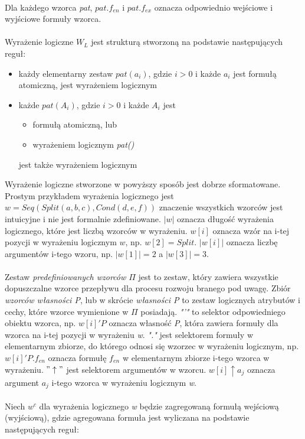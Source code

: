 \documentclass[a4paper, 11pt]{article}
\begin{document}
	\\
	Dla każdego wzorca \textit{pat}, $pat.f_{en}$ i $pat.f_{ex}$ oznacza odpowiednio wejściowe i wyjściowe formuły wzorca.
	\\
	\\
	Wyrażenie logiczne $W_L$ jest strukturą stworzoną na podstawie następujących reguł:
	\begin{itemize}
		\item każdy elementarny zestaw $pat(a_i)$, gdzie $i>0$ i każde $a_i$ jest formułą atomiczną, jest wyrażeniem logicznym
		\item każde $pat(A_i)$, gdzie $i>0$ i każde $A_i$ jest
		\begin{itemize}
			\item formułą atomiczną, lub
			\item wyrażeniem logicznym \textit{pat()}
		\end{itemize}
		jest także wyrażeniem logicznym
	\end{itemize}
	Wyrażenie logiczne stworzone w powyższy sposób jest dobrze sformatowane. Prostym przykładem wyrażenia logicznego jest $w=Seq(Split(a,b,c),Cond(d,e,f))$ znaczenie wszystkich wzorców jest intuicyjne i nie jest formalnie zdefiniowane. $|w|$ oznacza długość wyrażenia logicznego, które jest liczbą wzorców w wyrażeniu. $w[i]$ oznacza wzór na i-tej pozycji w wyrażeniu logicznym $w$, np. $w[2]=Split$. $|w[i]|$ oznacza liczbę argumentów i-tego wzoru, np. $|w[1]|=2$ a $|w[3]|=3.$
	\\
	\\
	Zestaw \textit{predefiniowanych wzorców $\Pi$} jest to zestaw, który zawiera wszystkie dopuszczalne wzorce przepływu dla procesu rozwoju branego pod uwagę. Zbiór \textit{wzorców własności P}, lub w skrócie \textit{własności P} to zestaw logicznych atrybutów i cechy, które wzorce wymienione w \textit{$\Pi$} posiadają.
	\textit{"'"} to selektor odpowiedniego obiektu wzorca, np. \textit{$w[i]'P$} oznacza własność \textit{P}, która zawiera formuły dla wzorca na i-tej pozycji w wyrażeniu \textit{w}. \textit{"."} jest selektorem formuły w elementarnym zbiorze, do którego odnosi się wzorzec w wyrażeniu logicznym, np. $w[i]'P.f_{en}$ oznacza formułę $f_{en}$ w elementarnym zbiorze i-tego wzorca w wyrażeniu. $"\uparrow"$ jest selektorem argumentów w wzorcu. $w[i]\uparrow a_j$ oznacza argument $a_j$ i-tego wzorca w wyrażeniu logicznym \textit{w}.
	\\
	\\
	Niech $w^c$ dla wyrażenia logicznego \textit{w} będzie zagregowaną formułą wejściową (wyjściową), gdzie agregowana formuła jest wyliczana na podstawie następujących reguł:
\end{document}
